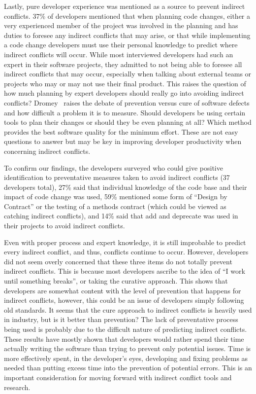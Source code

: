 \documentclass[conference]{IEEEtran}
\begin{document}
Lastly, pure developer experience was mentioned
as a source to prevent indirect conflicts. 37\% of developers mentioned that when planning code changes, either a very experienced member
of the project was involved in the planning and has duties to foresee any indirect conflicts that may arise, or that while implementing
a code change developers must use their personal knowledge to predict where indirect conflicts will occur. While most interviewed developers
had such an expert in their software projects, they admitted to not being able to foresee all indirect conflicts that may occur, especially
when talking about external teams or projects who may or may not use their final product. This raises the question of how much planning
by expert developers should really go into avoiding indirect conflicts? Dromey~\cite{} raises the debate of prevention versus cure of software
defects and how difficult a problem it is to measure. Should developers be using certain tools to plan their changes or should they be even
planning at all? Which method provides the best software quality for the minimum effort. These are not easy questions to answer but may
be key in improving developer productivity when concerning indirect conflicts.

To confirm our findings, the developers surveyed who could give positive identification to preventative measures taken to avoid indirect conflicts (37 developers
total), 27\% said that individual knowledge of the code base and their impact of code change was used, 59\% mentioned some form of ``Design
by Contract'' or the testing of a methods contract (which could be viewed as catching indirect conflicts), and 14\% said that add and
deprecate was used in their projects to avoid indirect conflicts.

Even with proper process and expert knowledge, it is still improbable to predict every indirect conflict, and thus, conflicts 
continue to occur. However, developers did not seem overly concerned that these three items do not totally prevent indirect conflicts. This
is because most developers ascribe to the idea of ``I work until something breaks'', or taking the curative approach. This shows that developers are somewhat content with
the level of prevention that happens for indirect conflicts, however, this could be an issue of developers simply following old standards.
It seems that the cure approach to indirect conflicts is heavily used in industry, but is it better than prevention?
The lack of preventative process being used is probably due to the difficult nature of predicting indirect conflicts. These results have mostly
shown that developers would rather spend their time actually writing the software than trying to prevent only potential issues. Time is
more effectively spent, in the developer's eyes, developing and fixing problems as needed than putting excess time into the prevention of potential errors.
This is an important consideration for moving forward with indirect conflict tools and research.
\end{document}
